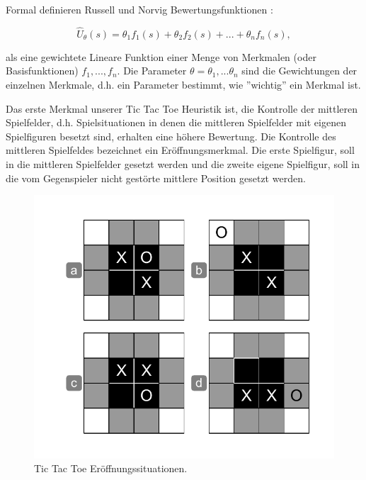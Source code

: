 Formal definieren Russell und Norvig Bewertungsfunktionen \cite[218]{Russell}: 

\begin{equation*}
\hat{U}_\theta(s) = \theta_1 f_1(s) + \theta_2 f_2(s) + ... + \theta_n f_n(s),
\end{equation*}

als eine gewichtete Lineare Funktion einer Menge von Merkmalen (oder Basisfunktionen) $f_1, ..., f_n$. Die Parameter $\theta = \theta_1, ... \theta_n$ sind die Gewichtungen der einzelnen Merkmale, d.h. ein Parameter bestimmt, wie ''wichtig'' ein Merkmal ist.

Das erste Merkmal unserer Tic Tac Toe Heuristik ist, die Kontrolle der mittleren Spielfelder, d.h. Spielsituationen in denen die mittleren Spielfelder mit eigenen Spielfiguren besetzt sind, erhalten eine höhere Bewertung. Die Kontrolle des mittleren Spielfeldes bezeichnet ein Eröffnungsmerkmal. Die erste Spielfigur, soll in die mittleren Spielfelder gesetzt werden und die zweite eigene Spielfigur, soll in die vom Gegenspieler nicht gestörte mittlere Position gesetzt werden. \\

\begin{figure}[!htbp]
  \centering
  \includegraphics[scale = 0.5]{inhalt/abbildungen/tictactoe_mid_control.pdf}
  \caption{Tic Tac Toe Eröffnungssituationen.}
  \label{fig:tictactoe_mid_control}
\end{figure}


